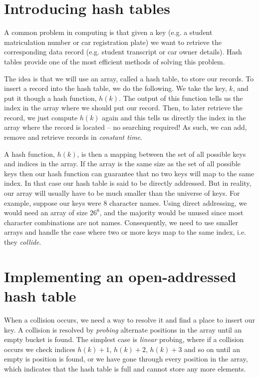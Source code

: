 \documentclass[10pt, a4paper, twosize]{article}
\begin{document}
\section{Introducing hash tables}
A common problem in computing is that given a key (e.g. a student matriculation number or car registration plate) we want to retrieve the corresponding data record (e.g. student transcript or car owner details). Hash tables provide one of the most efficient methods of solving this problem. 

The idea is that we will use an array, called a hash table, to store our records. To insert a record into the hash table, we do the following. We take the key, $k$, and put it though a hash function, $h(k)$. The output of this function tells us the index in the array where we should put our record. Then, to later retrieve the record, we just compute $h(k)$ again and this tells us directly the index in the array where the record is located -- no searching required! As such, we can add, remove and retrieve records in \emph{constant time}.

A hash function, $h(k)$, is then a mapping between the set of all possible keys and indices in the array. If the array is the same size as the set of all possible keys then our hash function can guarantee that no two keys will map to the same index. In that case our hash table is said to be directly addressed. But in reality, our array will usually have to be much smaller than the universe of keys. For example, suppose our keys were 8 character names. Using direct addressing, we would need an array of size $26^8$, and the majority would be unused since most character combinations are not names. Consequently, we need to use smaller arrays and handle the case where two or more keys map to the same index, i.e. they \emph{collide}.  


\section{Implementing an open-addressed hash table}
When a collision occurs, we need a way to resolve it and find a place to insert our key. A collision is resolved by \emph{probing} alternate positions in the array until an empty bucket is found. The simplest case is \emph{linear} probing, where if a collision occurs we check indices $h(k)+1$, $h(k)+2$, $h(k)+3$ and so on until an empty is position is found, or we have gone through every position in the array, which indicates that the hash table is full and cannot store any more elements. 
\end{document}
